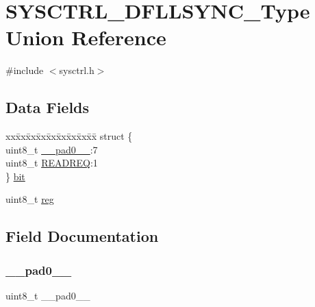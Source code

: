 \hypertarget{union_s_y_s_c_t_r_l___d_f_l_l_s_y_n_c___type}{}\section{S\+Y\+S\+C\+T\+R\+L\+\_\+\+D\+F\+L\+L\+S\+Y\+N\+C\+\_\+\+Type Union Reference}
\label{union_s_y_s_c_t_r_l___d_f_l_l_s_y_n_c___type}


{\ttfamily \#include $<$sysctrl.\+h$>$}

\subsection*{Data Fields}
\begin{DoxyCompactItemize}
\item 
\begin{tabbing}
xx\=xx\=xx\=xx\=xx\=xx\=xx\=xx\=xx\=\kill
struct \{\\
\>uint8\_t \mbox{\hyperlink{union_s_y_s_c_t_r_l___d_f_l_l_s_y_n_c___type_a8b4eebe79ded0459acec2f4950102ba3}{\_\_pad0\_\_}}:7\\
\>uint8\_t \mbox{\hyperlink{union_s_y_s_c_t_r_l___d_f_l_l_s_y_n_c___type_ae62a9ab1343e0f2ae90d9e8bf3c9989b}{READREQ}}:1\\
\} \mbox{\hyperlink{union_s_y_s_c_t_r_l___d_f_l_l_s_y_n_c___type_a1feeb9943d6ea993b6e735298918ef03}{bit}}\\

\end{tabbing}\item 
uint8\+\_\+t \mbox{\hyperlink{union_s_y_s_c_t_r_l___d_f_l_l_s_y_n_c___type_a9428adc9af4653a2050e2536b55dec8d}{reg}}
\end{DoxyCompactItemize}


\subsection{Field Documentation}
\mbox{\label{union_s_y_s_c_t_r_l___d_f_l_l_s_y_n_c___type_a8b4eebe79ded0459acec2f4950102ba3}} 
\subsubsection{\texorpdfstring{\_\_pad0\_\_}{\_\_pad0\_\_}}
{\footnotesize\ttfamily uint8\+\_\+t \+\_\+\+\_\+pad0\+\_\+\+\_\+}

